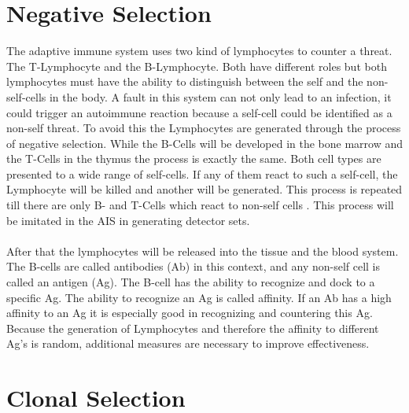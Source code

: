 \section{Negative Selection}

The adaptive immune system uses two kind of lymphocytes to counter a threat. The T-Lymphocyte and the B-Lymphocyte. Both have different roles but both lymphocytes must have the ability to distinguish between the self and the non-self-cells in the body. A fault in this system can not only lead to an infection, it could trigger an autoimmune reaction because a self-cell could be identified as a non-self threat. To avoid this the Lymphocytes are generated through the process of negative selection. While the B-Cells will be developed in the bone marrow and the T-Cells in the thymus the process is exactly the same. Both cell types are presented to a wide range of self-cells. If any of them react to such a self-cell, the Lymphocyte will be killed and another will be generated. This process is repeated till there are only B- and T-Cells which react to non-self cells \cite{tan2016artificial}. This process will be imitated in the AIS in generating detector sets.
\\\\
After that the lymphocytes will be released into the tissue and the blood system. The B-cells are called antibodies (Ab) in this context, and any non-self cell is called an antigen (Ag). The B-cell has the ability to recognize and dock to a specific Ag. The ability to recognize an Ag is called affinity. If an Ab has a high affinity to an Ag it is especially good in recognizing and countering this Ag. Because the generation of Lymphocytes and therefore the affinity to different Ag’s is random, additional measures are necessary to improve effectiveness.

\section{Clonal Selection}

